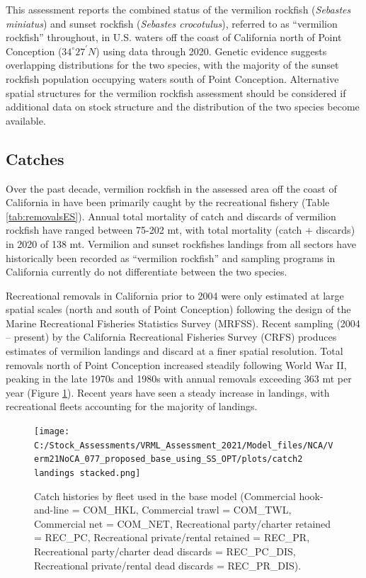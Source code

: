 \documentclass[
  english,
  a4paper,
]{article}
\begin{document}
This assessment reports the combined status of the vermilion rockfish (\emph{Sebastes miniatus}) and sunset rockfish (\emph{Sebastes crocotulus}), referred to as ``vermilion rockfish'' throughout, in U.S. waters off the coast of California north
of Point Conception ($34^\circ 27^\prime N$) using data through 2020. Genetic evidence suggests
overlapping distributions for the two species, with the majority of the sunset rockfish population occupying waters south of Point Conception. Alternative spatial structures for the vermilion rockfish assessment should be considered if additional data on stock structure and the distribution of the two species become available.

\hypertarget{catches}{%
\subsection*{Catches}\label{catches}}

Over the past decade, vermilion rockfish in the assessed area off the coast of California in have been
primarily caught by the recreational fishery (Table \ref{tab:removalsES}).
Annual total mortality of catch and discards of vermilion rockfish have ranged between
75-202
mt, with total mortality (catch + discards) in 2020 of 138 mt.
Vermilion and sunset rockfishes landings from all sectors have historically been recorded as
``vermilion rockfish'' and sampling programs in California currently do not
differentiate between the two species.

Recreational removals in California prior to 2004 were only estimated at large
spatial scales (north and south of Point Conception) following the design of
the Marine Recreational Fisheries Statistics Survey (MRFSS). Recent sampling
(2004 -- present) by the California Recreational Fisheries Survey (CRFS) produces
estimates of vermilion landings and discard at a finer spatial resolution. Total
removals north of Point Conception increased steadily following World
War II, peaking in the late 1970s and 1980s with annual removals exceeding
363 mt per year (Figure \ref{fig:catch}). Recent
years have seen a steady increase in landings, with recreational fleets accounting for the majority of landings.

\FloatBarrier

\begin{figure}
\centering
\texttt{[image: C:/Stock\_Assessments/VRML\_Assessment\_2021/Model\_files/NCA/Verm21NoCA\_077\_proposed\_base\_using\_SS\_OPT/plots/catch2 landings stacked.png]}
\caption{Catch histories by fleet used in the base model
(Commercial hook-and-line = COM\_HKL,
Commercial trawl = COM\_TWL, Commercial net = COM\_NET,
Recreational party/charter retained = REC\_PC, Recreational
private/rental retained = REC\_PR, Recreational party/charter
dead discards = REC\_PC\_DIS, Recreational private/rental dead
discards = REC\_PR\_DIS).\label{fig:catch}}
\end{figure}
\end{document}
